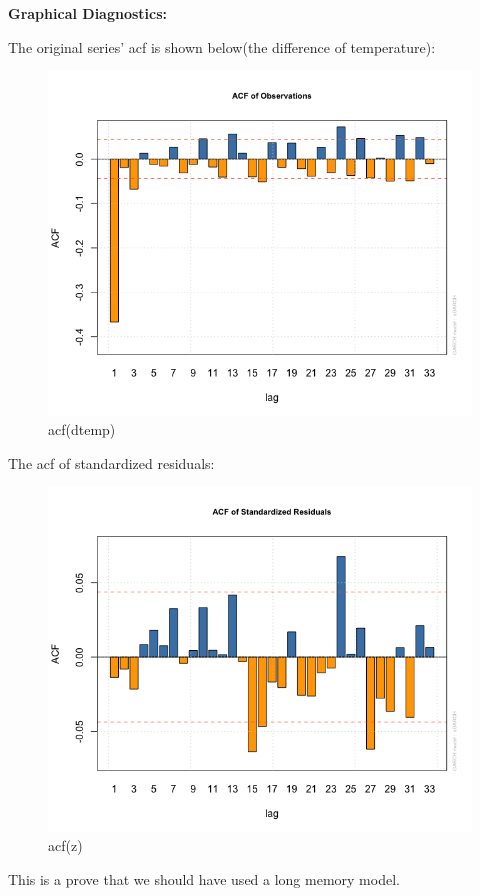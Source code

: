 \documentclass[a4paper, 11pt]{article}
\begin{document}
\textbf{Graphical Diagnostics:}\par
The original series' acf is shown below(the difference of temperature):
\begin{figure}[H]
\centering
\caption{acf(dtemp)}
\includegraphics[scale=.60]{original_acf.png}
\end{figure}

The acf of standardized residuals:
\begin{figure}[H]
\centering
\caption{acf(z)}
\includegraphics[scale=.60]{zacf.png}
\end{figure}
This is a prove that we should have used a long memory model.\par 
\end{document}
